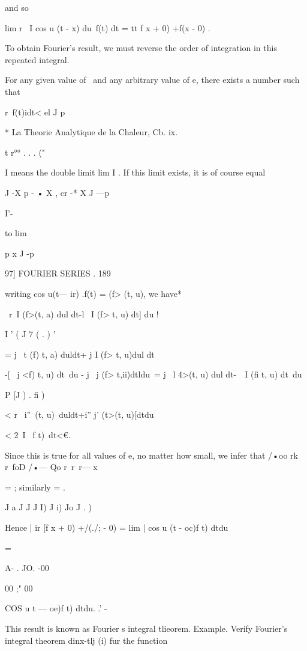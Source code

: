 {and so



lim r \ I cos u (t - x) du\ f(t) dt = tt f x + 0) +f(x - 0) .

To obtain Fourier's result, we must reverse the order of integration
in this repeated integral.

For any given value of \ and any arbitrary value of e, there exists a
number such that

r\ f(t)idt< el J p

* La Theorie Analytique de la Chaleur, Cb. ix.

t r°° . . . ("

I means the double limit lim I . If this limit exists, it is of course
equal

J -X p - • X , cr -* X J —p

I'-



to lim

p x J -p



97] FOURIER SERIES . 189

writing cos u(t— ir) .f(t) = (f> (t, u), we have*

\ r\ I (f>(t, a) dul dt-l \ I (f> t, u) dt] du !

I ' ( J 7 ( . ) '

= j \ t (f) t, a) duldt+ j I (f> t, u)dul dt

-[ \ j <f) t, u) dt\ du - j \ j (f> t,ii)dtldu\ = j \ l 4>(t, u) dul
dt-\ \ I (fi t, u) dt\ du

  P [J ) . fi )

< r \ i''\ < t>(t, u)\ duldt+i'' j' (t>(t, u)[dtdu

< 2\ I \ f t)\ dt<€.

Since this is true for all values of e, no matter how small, we infer
that /•oo rk r\ foD /•— Qo r\ r\ r— x

= ; similarly = .

J a J J J I) J i) Jo J . )

Hence | ir [f x + 0) +/(./; - 0) = lim | cos u (t - oc)f t) dtdu



=



A- . JO. -00

00 ;" 00



COS u t — oe)f t) dtdu. .' -



This result is known as Fourier s integral tlieorem. Example. Verify
Fourier's integral theorem dinx-tlj (i) fur the function

}
